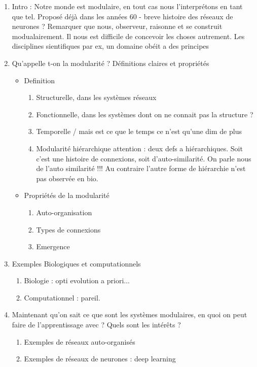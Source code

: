 \begin{enumerate}
\item Intro : Notre monde est modulaire, en tout cas nous l'interprétons en tant que tel. Proposé déjà dans les années 60 - breve histoire des réseaux de neurones ?
Remarquer que nous, observeur, raisonne et se construit modualairement. Il nous est difficile de concevoir les choses autrement. 
Les disciplines sientifiques par ex, un domaine obéit a des principes
\item Qu'appelle t-on la modularité ? Définitions claires et propriétés
	\begin{itemize}

		\item Definition
			\begin{enumerate}
			\item Structurelle, dans les systèmes réseaux
			\item Fonctionnelle, dans les systèmes dont on ne connait pas la structure ?\\
			\item Temporelle / mais est ce que le temps ce n'est qu'une dim de plus
			\item Modularité hiérarchique attention : deux defs a hiérarchiques. Soit c'est une histoire de connexions, soit d'auto-similarité. On parle nous de l'auto similarité !!! Au contraire l'autre forme de hiérarchie n'est pas observée en bio.
			\end{enumerate}
		
		\item Propriétés de la modularité 
			\begin{enumerate}
			\item Auto-organisation
			\item Types de connexions
			\item Emergence
			\end{enumerate}
	\end{itemize}	
\item Exemples Biologiques et computationnels
	\begin{enumerate}
	\item Biologie : opti evolution a priori...
	\item Computationnel : pareil.
	\end{enumerate}
	
\item Maintenant qu'on sait ce que sont les systèmes modulaires, en quoi on peut faire de l'apprentissage avec ? Quels sont les intérêts ?
	\begin{enumerate}
		\item Exemples de réseaux auto-organisés
		\item Exemples de réseaux de neurones : deep learning
	\end{enumerate}

\end{enumerate}






